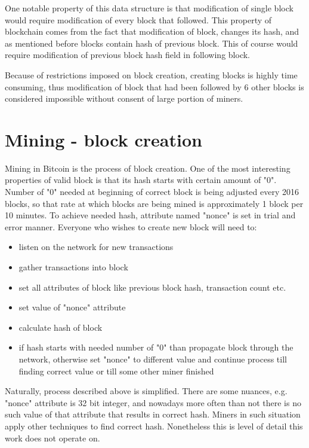 \documentclass[12pt, en, eng, oneside]{mgr}
\begin{document}
One notable property of this data structure is that modification of single block would require modification of every block that followed. This property of blockchain comes from the fact that modification of block, changes its hash, and as mentioned before blocks contain hash of previous block. This of course would require modification of previous block hash field in following block. 

Because of restrictions imposed on block creation, creating blocks is highly time consuming, thus modification of block that had been followed by 6 other blocks is considered impossible without consent of large portion of miners.

\section{Mining - block creation}
Mining in Bitcoin is the process of block creation. One of the most interesting properties of valid block is that its hash starts with certain amount of "0". Number of "0" needed at beginning of correct block is being adjusted every 2016 blocks, so that rate at which blocks are being mined is approximately 1 block per 10 minutes. To achieve needed hash, attribute named "nonce" is set in trial and error manner. Everyone who wishes to create new block will need to:

\begin{itemize}
\item
listen on the network for new transactions
\item
gather transactions into block
\item
set all attributes of block like previous block hash, transaction count etc.
\item
set value of "nonce" attribute
\item
calculate hash of block
\item
if hash starts with needed number of "0" than propagate block through the network, otherwise set "nonce" to different value and continue process till finding correct value or till some other miner finished 
\end{itemize}

Naturally, process described above is simplified. There are some nuances, e.g. "nonce" attribute is 32 bit integer, and nowadays more often than not there is no such value of that attribute that results in correct hash. Miners in such situation apply other techniques to find correct hash. Nonetheless this is level of detail this work does not operate on.
 
\end{document}
